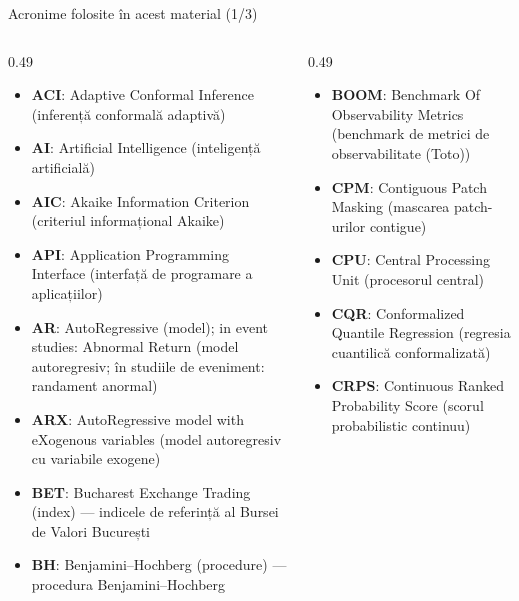 {
\begin{frame}[noframenumbering]
    \titlepage
\end{frame}
}
\begin{frame}{Acronime folosite în acest material (1/3)}
\begin{columns}[T]
\begin{column}{0.49\textwidth}
\begin{itemize}\setlength{\itemsep}{0pt}
    \item \textbf{ACI}: Adaptive Conformal Inference (inferență conformală adaptivă)
    \item \textbf{AI}: Artificial Intelligence (inteligență artificială)
    \item \textbf{AIC}: Akaike Information Criterion (criteriul informațional Akaike)
    \item \textbf{API}: Application Programming Interface (interfață de programare a aplicațiilor)
    \item \textbf{AR}: AutoRegressive (model); in event studies: Abnormal Return (model autoregresiv; în studiile de eveniment: randament anormal)
    \item \textbf{ARX}: AutoRegressive model with eXogenous variables (model autoregresiv cu variabile exogene)
    \item \textbf{BET}: Bucharest Exchange Trading (index) — indicele de referință al Bursei de Valori București
    \item \textbf{BH}: Benjamini–Hochberg (procedure) — procedura Benjamini–Hochberg
\end{itemize}
\end{column}
\begin{column}{0.49\textwidth}
\begin{itemize}\setlength{\itemsep}{0pt}
    \item \textbf{BOOM}: Benchmark Of Observability Metrics (benchmark de metrici de observabilitate (Toto))
    \item \textbf{CPM}: Contiguous Patch Masking (mascarea patch-urilor contigue)
    \item \textbf{CPU}: Central Processing Unit (procesorul central)
    \item \textbf{CQR}: Conformalized Quantile Regression (regresia cuantilică conformalizată)
    \item \textbf{CRPS}: Continuous Ranked Probability Score (scorul probabilistic continuu)

\end{itemize}
\end{column}
\end{columns}
\end{frame}
